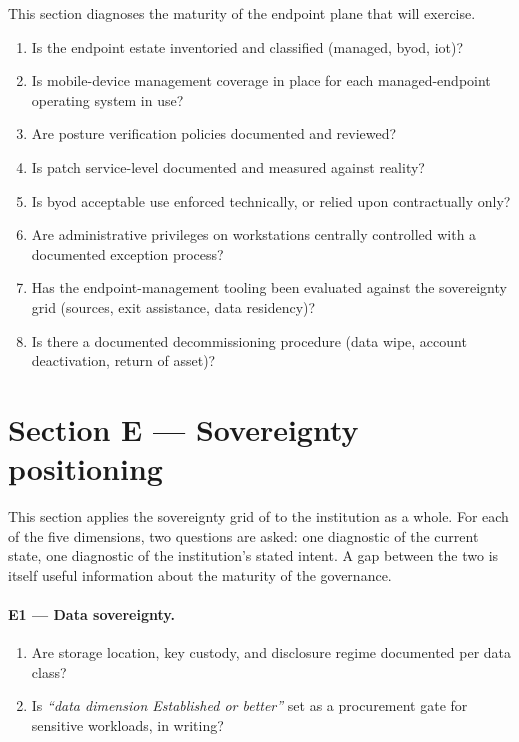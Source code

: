 This section diagnoses the maturity of the endpoint plane that
 will
exercise.

\begin{enumerate}[leftmargin=2em,nosep,label=D\arabic*.]
  \item Is the endpoint estate inventoried and classified (managed,
  \gls{byod}, \gls{iot})?

  \item Is mobile-device management coverage in place for each
  managed-endpoint operating system in use?

  \item Are posture verification policies documented and reviewed?

  \item Is patch service-level documented and measured against
  reality?

  \item Is \gls{byod} acceptable use enforced technically, or relied
  upon contractually only?

  \item Are administrative privileges on workstations centrally
  controlled with a documented exception process?

  \item Has the endpoint-management tooling been evaluated against the
  sovereignty grid (sources, exit assistance, data residency)?

  \item Is there a documented decommissioning procedure (data wipe,
  account deactivation, return of asset)?
\end{enumerate}

\section{Section E --- Sovereignty positioning}
\label{sec:sa-sovereignty}

This section applies the sovereignty grid of
 to the institution as a whole. For each
of the five dimensions, two questions are asked: one diagnostic of
the current state, one diagnostic of the institution's stated intent.
A gap between the two is itself useful information about the maturity
of the governance.

\paragraph{E1 --- Data sovereignty.}
\begin{enumerate}[leftmargin=2em,nosep,label=E1.\arabic*.]
  \item Are storage location, key custody, and disclosure regime
  documented per data class?
  \item Is \emph{``data dimension Established or better''} set as a
  procurement gate for sensitive workloads, in writing?
\end{enumerate}

